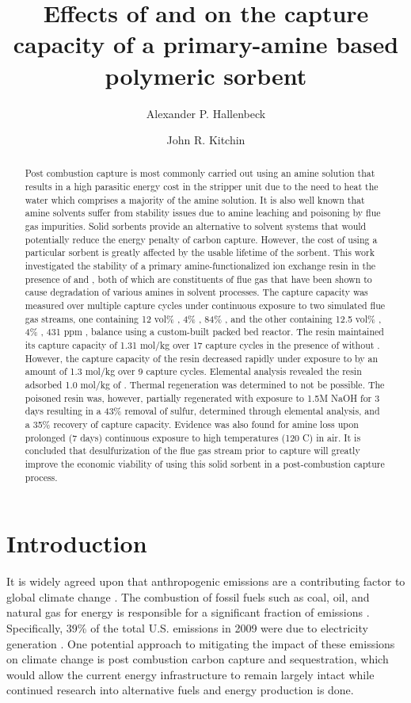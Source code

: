 \documentclass[journal=iecred,manuscript=article]{achemso}
\author{Alexander P. Hallenbeck}
\author{John R. Kitchin}
\affiliation[National Energy Technology Laboratory-Regional University Alliance (NETL-RUA)]{National Energy Technology Laboratory-Regional University Alliance (NETL-RUA), Pittsburgh, Pennsylvania 15236}
\date{}
\title{Effects of \ce{O_2} and \ce{SO_2} on the capture capacity of a primary-amine based polymeric \ce{CO_2} sorbent}
\begin{document}
\begin{abstract}
Post combustion  capture is most commonly carried out using an amine solution that results in a high parasitic energy cost in the stripper unit due to the need to heat the water which comprises a majority of the amine solution. It is also well known that amine solvents suffer from stability issues due to amine leaching and poisoning by flue gas impurities.
 Solid sorbents provide an alternative to solvent systems that would potentially reduce the energy penalty of carbon capture. However, the cost of using a particular sorbent is greatly affected by the usable lifetime of the sorbent. This work investigated the stability of a primary amine-functionalized ion exchange resin in the presence of  and , both of which are constituents of flue gas that have been shown to cause degradation of various amines in solvent processes. The  capture capacity was measured over multiple capture cycles under continuous exposure to two simulated flue gas streams, one containing 12 vol\% , 4\% , 84\% , and the other containing 12.5 vol\% , 4\% , 431 ppm , balance  using a custom-built packed bed reactor. The resin maintained its  capture capacity of 1.31 mol/kg over 17 capture cycles in the presence of  without . However, the  capture capacity of the resin decreased rapidly under exposure to  by an amount of 1.3 mol/kg over 9 capture cycles. Elemental analysis revealed the resin adsorbed 1.0 mol/kg of . Thermal regeneration was determined to not be possible. The poisoned resin was, however, partially regenerated with exposure to 1.5M NaOH for 3 days resulting in a 43\% removal of sulfur, determined through elemental analysis, and a 35\% recovery of  capture capacity. Evidence was also found for amine loss upon prolonged (7 days) continuous exposure to high temperatures (120 \textdegree{}C) in air. It is concluded that desulfurization of the flue gas stream prior to  capture will greatly improve the economic viability of using this solid sorbent in a post-combustion  capture process.  
\end{abstract}

\section{Introduction}
\label{sec-1}
It is widely agreed upon that anthropogenic  emissions are a contributing factor to global climate change \cite{working05:ipcc}.  The combustion of fossil fuels such as coal, oil, and natural gas for energy is responsible for a significant fraction of  emissions \cite{agency12:co-emiss-fuel-combus}.  Specifically, 39\% of the total U.S.  emissions in 2009 were due to electricity generation \cite{epa-inventory}.   One potential approach to mitigating the impact of these emissions on climate change is post combustion carbon capture and sequestration, which would allow the current energy infrastructure to remain largely intact while continued research into alternative fuels and energy production is done.
\end{document}
